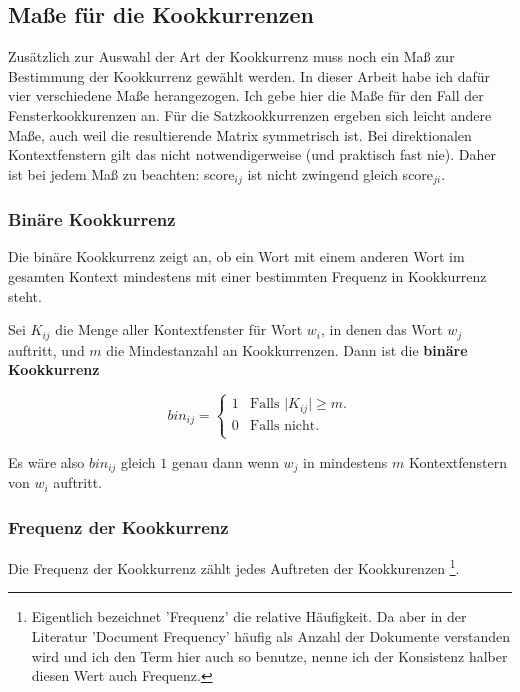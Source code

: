\documentclass[11pt,numbers=noenddot]{scrartcl}
\begin{document}
\subsection{Maße für die Kookkurrenzen} \label{coocmeasures}

Zusätzlich zur Auswahl der Art der Kookkurrenz muss noch ein Maß zur Bestimmung der Kookkurrenz gewählt werden. In dieser Arbeit habe ich dafür vier verschiedene Maße herangezogen. Ich gebe hier die Maße für den Fall der Fensterkookkurenzen an. Für die Satzkookkurrenzen ergeben sich leicht andere Maße, auch weil die resultierende Matrix symmetrisch ist. Bei direktionalen Kontextfenstern gilt das nicht notwendigerweise (und praktisch fast nie). Daher ist bei jedem Maß zu beachten: score$_{ij}$ ist nicht zwingend gleich score$_{ji}$.

\subsubsection{Binäre Kookkurrenz} \label{bin}

Die binäre Kookkurrenz zeigt an, ob ein Wort mit einem anderen Wort im gesamten Kontext mindestens mit einer bestimmten Frequenz in Kookkurrenz steht.

Sei $K_{ij}$ die Menge aller Kontextfenster für Wort $w_i$, in denen das Wort $w_j$ auftritt, und $m$ die Mindestanzahl an Kookkurrenzen. Dann ist die \textbf{binäre Kookkurrenz}

\begin{equation*}
   bin_{ij} =
   \begin{cases}
        1 & \text{Falls |$K_{ij}| \ge m$.}\\
        0 & \text{Falls nicht.}\\
   \end{cases}
\end{equation*}

Es wäre also $bin_{ij}$ gleich $1$ genau dann wenn $w_j$ in mindestens $m$ Kontextfenstern von $w_i$ auftritt. 

\subsubsection{Frequenz der Kookkurrenz} \label{freq}

Die Frequenz der Kookkurrenz zählt jedes Auftreten der Kookkurenzen \footnote{Eigentlich bezeichnet  'Frequenz' die relative Häufigkeit. Da aber in der Literatur 'Document Frequency' häufig als Anzahl der Dokumente verstanden wird und ich den Term hier auch so benutze, nenne ich der Konsistenz halber diesen Wert auch Frequenz. }.
\end{document}
